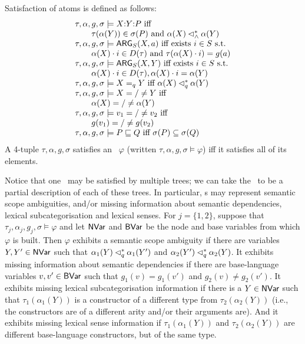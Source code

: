 \begin{definition}\label{defn:satisfaction}
Satisfaction of atoms is defined as follows:
$$
\begin{array}{l}
  \tau, \alpha, g, \sigma \models  X {:} Y {:} P
\mbox{ iff}\\
\qquad \tau(\alpha(Y)) \in \sigma(P) \mbox{ and } \alpha(X) \lhd^*_\wedge
  \alpha(Y) \\
  \tau, \alpha, g, \sigma \models \mathsf{ARG}_S(X,a)
\mbox{ iff exists  $i \in S$ s.t.}\\
\qquad  \alpha(X) \cdot i \in D(\tau) \mbox{ and }
  \tau(\alpha(X) \cdot 
  i) = g(a) \\
  \tau, \alpha, g, \sigma \models \mathsf{ARG}_S(X,Y)
\mbox{ iff  exists $i \in S$ s.t.}\\
\qquad \alpha(X) \cdot i \in D(\tau), \alpha(X) \cdot
  i = \alpha(Y)\\
  \tau, \alpha, g, \sigma \models X =_q Y
\mbox{ iff } \alpha(X) \lhd^*_q \alpha(Y) \\
  \tau, \alpha, g, \sigma \models X ={/}\neq Y
\mbox{ iff } \\
\qquad \alpha(X) ={/}\neq \alpha(Y) \\
  \tau, \alpha, g, \sigma \models v_1 ={/}\neq v_2
\mbox{ iff}\\
\qquad g(v_1) ={/}\neq g(v_2) \\
  \tau, \alpha, g, \sigma \models P \sqsubseteq Q
\mbox{ iff $\sigma(P) \subseteq \sigma(Q)$}
\end{array}
$$
A 4-tuple $\tau,\alpha,g,\sigma$ satisfies an \rmrs\ $\varphi$
(written $\tau,\alpha,g,\sigma \models \varphi$) iff it satisfies all
of its elements.
\end{definition}

Notice that one \rmrs\ may be satisfied by multiple trees; we can take
the \rmrs\ to be a partial description of each of these trees.  In
particular, \rmrs s may represent semantic scope ambiguities, and/or missing
information about semantic dependencies, 
lexical subcategorisation and lexical senses.  For $j=\{1,2\}$,
suppose that $\tau_j,\alpha_j,g_j,\sigma\models \varphi$ and let
$\mathsf{NVar}$ and $\mathsf{BVar}$ be the node and base variables from which
$\varphi$ is built.  Then 
$\varphi$ exhibits a semantic scope ambiguity if there are variables
$Y,Y'\in \mathsf{NVar}$ such that $\alpha_1(Y) \lhd^*_q \alpha_1(Y')$ and
$\alpha_2(Y')\lhd^*_q \alpha_2(Y)$.  It exhibits missing information
about semantic dependencies if there are base-language variables
$v,v'\in \mathsf{BVar}$ such that $g_1(v)=g_1(v')$ and $g_2(v)\neq g_2(v')$. 
It exhibits missing lexical subcategorisation information if there is
a $ Y \in \mathsf{NVar}$ such that $\tau_1(\alpha_1(Y))$ is a
constructor of a different type from $\tau_2(\alpha_2(Y))$  (i.e., the
constructors are of a different arity and/or their arguments are).
And it exhibits missing lexical sense information
if $\tau_1(\alpha_1(Y))$ and $\tau_2(\alpha_2(Y))$ are different
base-language constructors, but of the same type.

